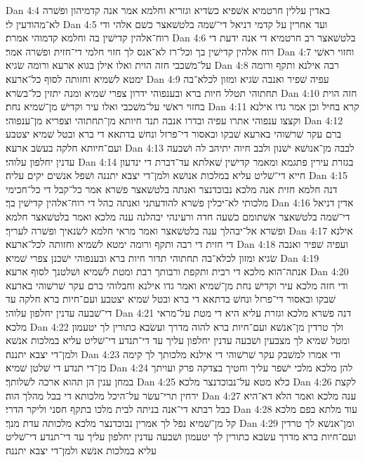 Dan 4:4  באדין עללין חרטמיא אשׁפיא כשׂדיא וגזריא וחלמא אמר אנה קדמיהון ופשׁרה לא־מהודעין לי׃
Dan 4:5  ועד אחרין על קדמי דניאל די־שׁמה בלטשׁאצר כשׁם אלהי ודי רוח־אלהין קדישׁין בה וחלמא קדמוהי אמרת׃
Dan 4:6  בלטשׁאצר רב חרטמיא די אנה ידעת די רוח אלהין קדישׁין בך וכל־רז לא־אנס לך חזוי חלמי די־חזית ופשׁרה אמר׃
Dan 4:7  וחזוי ראשׁי על־משׁכבי חזה הוית ואלו אילן בגוא ארעא ורומה שׂגיא׃
Dan 4:8  רבה אילנא ותקף ורומה ימטא לשׁמיא וחזותה לסוף כל־ארעא׃
Dan 4:9  עפיה שׁפיר ואנבה שׂגיא ומזון לכלא־בה תחתוהי תטלל חיות ברא ובענפוהי ידרון צפרי שׁמיא ומנה יתזין כל־בשׂרא׃
Dan 4:10  חזה הוית בחזוי ראשׁי על־משׁכבי ואלו עיר וקדישׁ מן־שׁמיא נחת׃
Dan 4:11  קרא בחיל וכן אמר גדו אילנא וקצצו ענפוהי אתרו עפיה ובדרו אנבה תנד חיותא מן־תחתוהי וצפריא מן־ענפוהי׃
Dan 4:12  ברם עקר שׁרשׁוהי בארעא שׁבקו ובאסור די־פרזל ונחשׁ בדתאא די ברא ובטל שׁמיא יצטבע ועם־חיותא חלקה בעשׂב ארעא׃
Dan 4:13  לבבה מן־אנושׁא ישׁנון ולבב חיוה יתיהב לה ושׁבעה עדנין יחלפון עלוהי׃
Dan 4:14  בגזרת עירין פתגמא ומאמר קדישׁין שׁאלתא עד־דברת די ינדעון חייא די־שׁליט עליא במלכות אנושׁא ולמן־די יצבא יתננה ושׁפל אנשׁים יקים עליה׃
Dan 4:15  דנה חלמא חזית אנה מלכא נבוכדנצר ואנתה בלטשׁאצר פשׁרא אמר כל־קבל די כל־חכימי מלכותי לא־יכלין פשׁרא להודעתני ואנתה כהל די רוח־אלהין קדישׁין בך׃
Dan 4:16  אדין דניאל די־שׁמה בלטשׁאצר אשׁתומם כשׁעה חדה ורעינהי יבהלנה ענה מלכא ואמר בלטשׁאצר חלמא ופשׁרא אל־יבהלך ענה בלטשׁאצר ואמר מראי חלמא לשׂנאיך ופשׁרה לעריך׃
Dan 4:17  אילנא די חזית די רבה ותקף ורומה ימטא לשׁמיא וחזותה לכל־ארעא׃
Dan 4:18  ועפיה שׁפיר ואנבה שׂגיא ומזון לכלא־בה תחתוהי תדור חיות ברא ובענפוהי ישׁכנן צפרי שׁמיא׃
Dan 4:19  אנתה־הוא מלכא די רבית ותקפת ורבותך רבת ומטת לשׁמיא ושׁלטנך לסוף ארעא׃
Dan 4:20  ודי חזה מלכא עיר וקדישׁ נחת מן־שׁמיא ואמר גדו אילנא וחבלוהי ברם עקר שׁרשׁוהי בארעא שׁבקו ובאסור די־פרזל ונחשׁ בדתאא די ברא ובטל שׁמיא יצטבע ועם־חיות ברא חלקה עד די־שׁבעה עדנין יחלפון עלוהי׃
Dan 4:21  דנה פשׁרא מלכא וגזרת עליא היא די מטת על־מראי מלכא׃
Dan 4:22  ולך טרדין מן־אנשׁא ועם־חיות ברא להוה מדרך ועשׂבא כתורין לך יטעמון ומטל שׁמיא לך מצבעין ושׁבעה עדנין יחלפון עליך עד די־תנדע די־שׁליט עליא במלכות אנשׁא ולמן־די יצבא יתננה׃
Dan 4:23  ודי אמרו למשׁבק עקר שׁרשׁוהי די אילנא מלכותך לך קימה מן־די תנדע די שׁלטן שׁמיא׃
Dan 4:24  להן מלכא מלכי ישׁפר עליך וחטיך בצדקה פרק ועויתך במחן ענין הן תהוא ארכה לשׁלותך׃
Dan 4:25  כלא מטא על־נבוכדנצר מלכא׃
Dan 4:26  לקצת ירחין תרי־עשׂר על־היכל מלכותא די בבל מהלך הוה׃
Dan 4:27  ענה מלכא ואמר הלא דא־היא בבל רבתא די־אנה בניתה לבית מלכו בתקף חסני וליקר הדרי׃
Dan 4:28  עוד מלתא בפם מלכא קל מן־שׁמיא נפל לך אמרין נבוכדנצר מלכא מלכותה עדת מנך׃
Dan 4:29  ומן־אנשׁא לך טרדין ועם־חיות ברא מדרך עשׂבא כתורין לך יטעמון ושׁבעה עדנין יחלפון עליך עד די־תנדע די־שׁליט עליא במלכות אנשׁא ולמן־די יצבא יתננה׃
